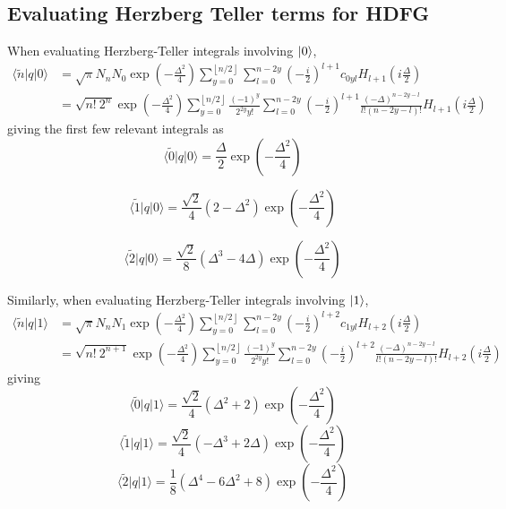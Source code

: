 \documentclass[aip, jcp, reprint, onecolumn, nofootinbib]{revtex4-2}
\begin{document}
\subsection{Evaluating Herzberg Teller terms for HDFG}
When evaluating Herzberg-Teller integrals involving $\ket{0}$,
\begin{equation}
\begin{split}
	\langle \tilde{n} |q| 0 \rangle &= 
	\sqrt{\pi} N_n N_0 \exp(-\frac{\Delta^2}{4}) \sum_{y=0}^{\left\lfloor{n/2}\right\rfloor} \sum_{l=0}^{n-2y} \left( -\frac{i}{2} \right)^{l+1} c_{0yl} H_{l+1}\left(i\frac{\Delta}{2}\right) \\
	&= \sqrt{n! \ 2^n} \exp(-\frac{\Delta^2}{4})
	\sum_{y=0}^{\left\lfloor{n/2}\right\rfloor} 
	\frac{(-1)^y}{2^{2y}y!}
	\sum_{l=0}^{n-2y} \left( -\frac{i}{2} \right)^{l+1} 
	\frac{\left(-\Delta\right)^{n-2y-l}}{l!(n-2y-l)!}
	H_{l+1}\left(i\frac{\Delta}{2}\right)
\end{split}
\end{equation}
giving the first few relevant integrals as
\begin{equation}
	\langle \tilde{0} |q| 0 \rangle = \frac{\Delta}{2} \exp(-\frac{\Delta^2}{4})
\end{equation}

\begin{equation}
	\langle \tilde{1} |q| 0 \rangle = 
	\frac{\sqrt{2}}{4} \left( 2 - \Delta^2 \right)
	\exp(-\frac{\Delta^2}{4})
\end{equation}

\begin{equation}
	\langle \tilde{2} |q| 0 \rangle = 
	\frac{\sqrt{2}}{8} \left( \Delta^3 - 4 \Delta \right)
	\exp(-\frac{\Delta^2}{4})
\end{equation}

Similarly, when evaluating Herzberg-Teller integrals involving $\ket{1}$, 
\begin{equation}
	\begin{split}
		\langle \tilde{n} |q| 1 \rangle &= \sqrt{\pi} N_n N_1 \exp(-\frac{\Delta^2}{4}) \sum_{y=0}^{\left\lfloor{n/2}\right\rfloor} \sum_{l=0}^{n-2y} \left( -\frac{i}{2} \right)^{l+2} c_{1yl} H_{l+2}\left(i\frac{\Delta}{2}\right) \\
		&= 
		\sqrt{n! \ 2^{n+1}} \exp(-\frac{\Delta^2}{4}) 
		\sum_{y=0}^{\left\lfloor{n/2}\right\rfloor} 
		\frac{(-1)^y}{2^{2y}y!}
		\sum_{l=0}^{n-2y} \left( -\frac{i}{2} \right)^{l+2} 
		\frac{\left(-\Delta\right)^{n-2y-l}}{l!(n-2y-l)!}
		H_{l+2}\left(i\frac{\Delta}{2}\right)
	\end{split}
\end{equation}
giving
\begin{equation}
	\langle \tilde{0} |q| 1 \rangle = \frac{\sqrt{2}}{4}\left( \Delta^2 + 2 \right)
	\exp(-\frac{\Delta^2}{4})
\end{equation}
\begin{equation}
	\langle \tilde{1} |q| 1 \rangle = \frac{\sqrt{2}}{4}\left( -\Delta^3 + 2\Delta \right)
	\exp(-\frac{\Delta^2}{4})
\end{equation}
\begin{equation}
	\langle \tilde{2} |q| 1 \rangle = \frac{1}{8} \left( \Delta^4 - 6\Delta^2 + 8 \right)
	\exp(-\frac{\Delta^2}{4})
\end{equation}
\end{document}
